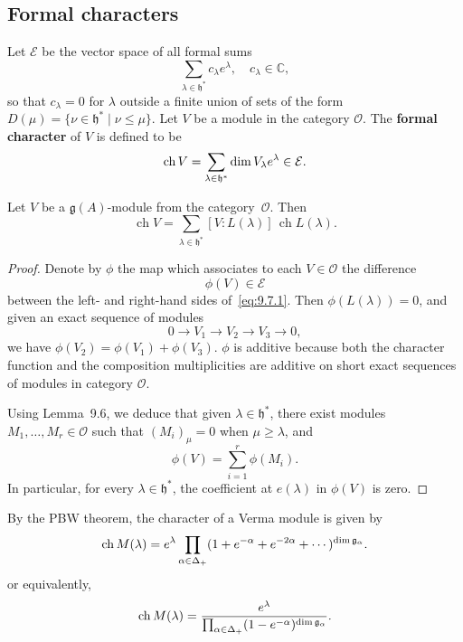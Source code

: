 \documentclass[12pt]{article}
\begin{document}
\subsection{Formal characters}
Let $\mathcal{E}$ be the vector space of all formal sums
\[\sum_{\lambda \in \mathfrak{h}^*} c_\lambda e^\lambda, \quad c_\lambda \in \mathbb{C},\]
so that $c_\lambda = 0$ for $\lambda$ outside a finite union of sets of the form $D(\mu) = \{\nu \in \mathfrak{h}^* \mid \nu \leq \mu\}$. Let $V$ be a module in the category $\mathcal{O}$. The \textbf{formal character} of $V$ is defined to be
\[\operatorname{ch} V = \sum_{\lambda \in \mathfrak{h}^*}\dim V_\lambda e^\lambda \in \mathcal{E}.\]

\begin{proposition}[9.7]
    Let $V$ be a $\mathfrak{g}(A)$-module from the category~$\mathcal{O}$. Then
    \begin{equation}\label{eq:9.7.1}
        \operatorname{ch} V
        = \sum_{\lambda \in \mathfrak{h}^*} [V : L(\lambda)]\, \operatorname{ch} L(\lambda).
    \end{equation}
\end{proposition}

\begin{proof}
    Denote by $\phi$ the map which associates to each $V \in \mathcal{O}$ the difference
    \[
        \phi(V) \in \mathcal{E}
    \]
    between the left- and right-hand sides of~\eqref{eq:9.7.1}.
    Then $\phi(L(\lambda)) = 0$, and given an exact sequence of modules
    \[
        0 \to V_1 \to V_2 \to V_3 \to 0,
    \]
    we have $\phi(V_2) = \phi(V_1) + \phi(V_3)$. $\phi$ is additive because both the character function and the composition multiplicities are additive on short exact sequences of modules in category $\mathcal{O}$.

    Using Lemma~9.6, we deduce that given $\lambda \in \mathfrak{h}^*$, there exist modules
    $M_1,\dots,M_r \in \mathcal{O}$ such that $(M_i)_\mu = 0$ when $\mu \ge \lambda$, and
    \[
        \phi(V) = \sum_{i=1}^r \phi(M_i).
    \]
    In particular, for every $\lambda \in \mathfrak{h}^*$, the coefficient at $e(\lambda)$ in $\phi(V)$ is zero.
\end{proof}

By the PBW theorem, the character of a Verma module is given by
\[
    \operatorname{ch} M(\lambda) = e^\lambda \prod_{\alpha \in \Delta_+} (1 + e^{-\alpha} + e^{-2\alpha} + \cdots)^{\dim \mathfrak{g}_\alpha}.
\] or equivalently,
\[
    \operatorname{ch} M(\lambda) = \frac{e^\lambda}{\prod_{\alpha \in \Delta_+} (1 - e^{-\alpha})^{\dim \mathfrak{g}_\alpha}}.
\]
\end{document}
